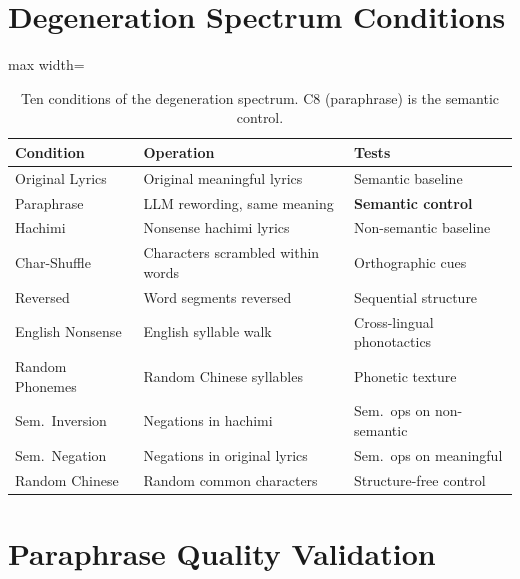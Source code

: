 \documentclass[11pt]{article}
\begin{document}


\appendix

\section{Degeneration Spectrum Conditions}\label{app:conditions}

\begin{table}[!h]
\centering
\caption{Ten conditions of the degeneration spectrum. C8 (paraphrase) is the semantic control.}
\label{tab:conditions}
\small
\begin{adjustbox}{max width=\columnwidth}
\begin{tabular}{lll}
\toprule
\textbf{Condition} & \textbf{Operation} & \textbf{Tests} \\
\midrule
Original Lyrics    & Original meaningful lyrics         & Semantic baseline \\
Paraphrase         & LLM rewording, same meaning        & \textbf{Semantic control} \\
Hachimi             & Nonsense hachimi lyrics             & Non-semantic baseline \\
Char-Shuffle        & Characters scrambled within words   & Orthographic cues \\
Reversed            & Word segments reversed              & Sequential structure \\
English Nonsense    & English syllable walk                & Cross-lingual phonotactics \\
Random Phonemes     & Random Chinese syllables             & Phonetic texture \\
Sem.\ Inversion     & Negations in hachimi               & Sem.\ ops on non-semantic \\
Sem.\ Negation      & Negations in original lyrics         & Sem.\ ops on meaningful \\
Random Chinese      & Random common characters            & Structure-free control \\
\bottomrule
\end{tabular}
\end{adjustbox}
\end{table}

\section{Paraphrase Quality Validation}\label{app:paraphrase}
\end{document}
